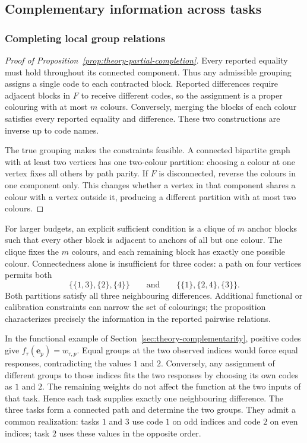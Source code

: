 \subsection{Complementary information across tasks}
\label{app:theory-partial}

\subsubsection{Completing local group relations}

\begin{proof}[Proof of Proposition~\ref{prop:theory-partial-completion}]
    Every reported equality must hold throughout its connected
    component. Thus any admissible grouping assigns a single code
    to each contracted block. Reported differences require adjacent
    blocks in $F$ to receive different codes, so the assignment is
    a proper colouring with at most $m$ colours.
    Conversely, merging the blocks of each colour satisfies every
    reported equality and difference. These two constructions are
    inverse up to code names.

    The true grouping makes the constraints feasible.
    A connected bipartite graph with at least two vertices has one
    two-colour partition: choosing a colour at one vertex fixes all
    others by path parity. If $F$ is disconnected, reverse the
    colours in one component only. This changes whether a vertex
    in that component shares a colour with a vertex outside it,
    producing a different partition with at most two colours.
\end{proof}

For larger budgets, an explicit sufficient condition is a clique
of $m$ anchor blocks such that every other block is adjacent to
anchors of all but one colour. The clique fixes the $m$ colours,
and each remaining block has exactly one possible colour.
Connectedness alone is insufficient for three codes: a path on
four vertices permits both
$$
    \{\{1,3\},\{2\},\{4\}\}
    \qquad\text{and}\qquad
    \{\{1\},\{2,4\},\{3\}\}.
$$
Both partitions satisfy all three neighbouring differences.
Additional functional or calibration constraints can narrow the
set of colourings; the proposition characterizes precisely the
information in the reported pairwise relations.

In the functional example of
Section~\ref{sec:theory-complementarity}, positive codes give
$f_\tau(\mathbf e_p)=w_{\tau,p}$.
Equal groups at the two observed indices would force equal
responses, contradicting the values $1$ and $2$.
Conversely, any assignment of different groups to those indices
fits the two responses by choosing its own codes as $1$ and $2$.
The remaining weights do not affect the function at the two inputs
of that task. Hence each task supplies exactly one neighbouring
difference. The three tasks form a connected path and determine
the two groups. They admit a common realization: tasks $1$ and $3$
use code $1$ on odd indices and code $2$ on even indices; task $2$
uses these values in the opposite order.

